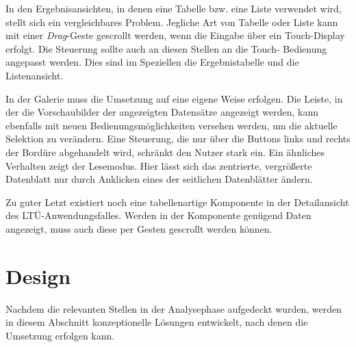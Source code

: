 In den Ergebnisansichten, in denen eine Tabelle bzw. eine Liste verwendet wird, stellt sich ein vergleichbares Problem. Jegliche Art von Tabelle oder Liste kann mit einer \textit{Drag}-Geste gescrollt werden, wenn die Eingabe über ein Touch-Display erfolgt. Die Steuerung sollte auch an diesen Stellen an die Touch- Bedienung angepasst werden. Dies sind im Speziellen die Ergebnistabelle und die Listenansicht.\par
In der Galerie muss die Umsetzung auf eine eigene Weise erfolgen. Die Leiste, in der die Vorschaubilder der angezeigten Datensätze angezeigt werden, kann ebenfalls mit neuen Bedienungsmöglichkeiten versehen werden, um die aktuelle Selektion zu verändern. Eine Steuerung, die nur über die Buttons links und rechts der Bordüre abgehandelt wird, schränkt den Nutzer stark ein. Ein ähnliches Verhalten zeigt der Lesemodus. Hier lässt sich das zentrierte, vergrößerte Datenblatt nur durch Anklicken eines der seitlichen Datenblätter ändern.\par
Zu guter Letzt existiert noch eine tabellenartige Komponente in der Detailansicht des LTÜ-Anwendungsfalles. Werden in der Komponente genügend Daten angezeigt, muss auch diese per Gesten gescrollt werden können.\par
\section{Design} \label{sec:designInteraction}
Nachdem die relevanten Stellen in der Analysephase aufgedeckt wurden, werden in diesem Abschnitt konzeptionelle Lösungen entwickelt, nach denen die Umsetzung erfolgen kann.\par
